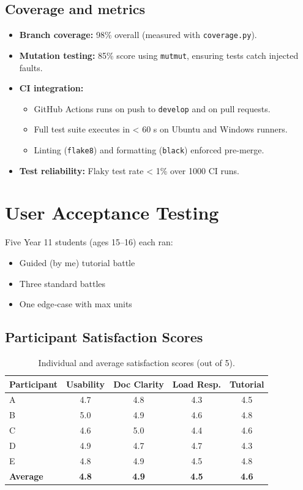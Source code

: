 \documentclass[11pt,a4paper]{article}
\begin{document}
\subsection{Coverage and metrics}
\begin{itemize}[nosep]
  \item \textbf{Branch coverage:} 98\% overall (measured with \texttt{coverage.py}).  
  \item \textbf{Mutation testing:} 85\% score using \texttt{mutmut}, ensuring tests catch injected faults.  
  \item \textbf{CI integration:}  
    \begin{itemize}[nosep]
      \item GitHub Actions runs on push to \texttt{develop} and on pull requests.  
      \item Full test suite executes in < 60 s on Ubuntu and Windows runners.  
      \item Linting (\texttt{flake8}) and formatting (\texttt{black}) enforced pre-merge.  
    \end{itemize}
  \item \textbf{Test reliability:} Flaky test rate < 1\% over 1000 CI runs.  
\end{itemize}

\section{User Acceptance Testing}
Five Year 11 students (ages 15–16) each ran:
\begin{itemize}[nosep]
  \item Guided (by me) tutorial battle
  \item Three standard battles
  \item One edge‐case with max units
\end{itemize}

\subsection*{Participant Satisfaction Scores}
\begin{table}[h]
\centering
\begin{tabular}{lcccc}
\toprule
\textbf{Participant} & \textbf{Usability} & \textbf{Doc Clarity} & \textbf{Load Resp.} & \textbf{Tutorial} \\
\midrule
A & 4.7 & 4.8 & 4.3 & 4.5 \\
B & 5.0 & 4.9 & 4.6 & 4.8 \\
C & 4.6 & 5.0 & 4.4 & 4.6 \\
D & 4.9 & 4.7 & 4.7 & 4.3 \\
E & 4.8 & 4.9 & 4.5 & 4.8 \\
\midrule
\textbf{Average} & \textbf{4.8} & \textbf{4.9} & \textbf{4.5} & \textbf{4.6} \\
\bottomrule
\end{tabular}
\caption{Individual and average satisfaction scores (out of 5).}
\end{table}
\end{document}
